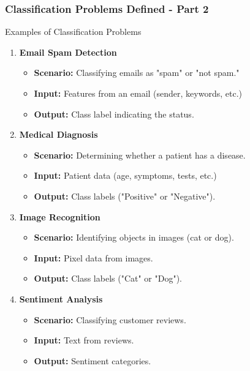 \documentclass[aspectratio=169]{beamer}
\begin{document}
\begin{frame}[fragile]
    \frametitle{Classification Problems Defined - Part 2}
    \begin{block}{Examples of Classification Problems}
        \begin{enumerate}
            \item \textbf{Email Spam Detection}
                \begin{itemize}
                    \item \textbf{Scenario:} Classifying emails as "spam" or "not spam."
                    \item \textbf{Input:} Features from an email (sender, keywords, etc.)
                    \item \textbf{Output:} Class label indicating the status.
                \end{itemize}
            \item \textbf{Medical Diagnosis}
                \begin{itemize}
                    \item \textbf{Scenario:} Determining whether a patient has a disease.
                    \item \textbf{Input:} Patient data (age, symptoms, tests, etc.)
                    \item \textbf{Output:} Class labels ("Positive" or "Negative").
                \end{itemize}
            \item \textbf{Image Recognition}
                \begin{itemize}
                    \item \textbf{Scenario:} Identifying objects in images (cat or dog).
                    \item \textbf{Input:} Pixel data from images.
                    \item \textbf{Output:} Class labels ("Cat" or "Dog").
                \end{itemize}
            \item \textbf{Sentiment Analysis}
                \begin{itemize}
                    \item \textbf{Scenario:} Classifying customer reviews.
                    \item \textbf{Input:} Text from reviews.
                    \item \textbf{Output:} Sentiment categories.
                \end{itemize}
        \end{enumerate}
    \end{block}
\end{frame}
\end{document}
